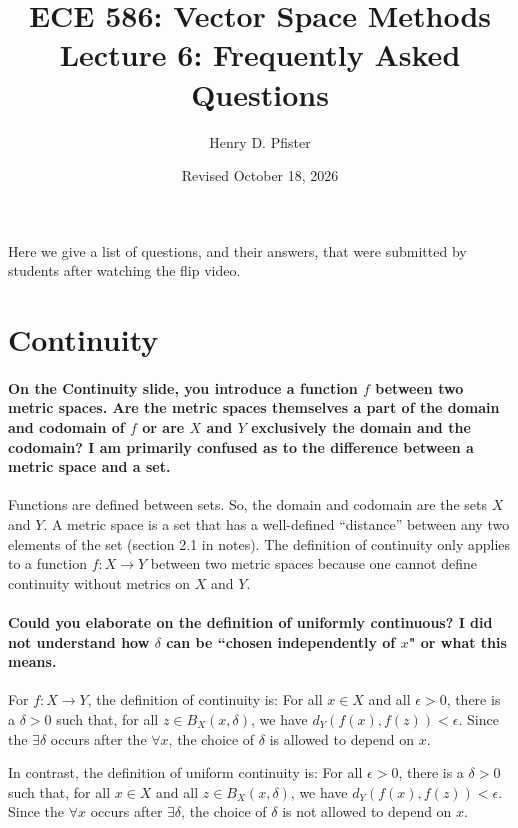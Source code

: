 \documentclass[10pt,english]{article}
\begin{document}
\title{ECE 586: Vector Space Methods \\ Lecture 6: Frequently Asked Questions}
\author{Henry D. Pfister \\ \univ}
\date{Revised October 18, 2026}

\maketitle

Here we give a list of questions, and their answers, that were submitted by students after watching the flip video.

\section{Continuity}

\paragraph{On the Continuity slide, you introduce a function $f$ between two metric spaces. Are the metric spaces themselves a part of the domain and codomain of $f$ or are $X$ and $Y$ exclusively the domain and the codomain? I am primarily confused as to the difference between a metric space and a set.}

Functions are defined between sets.
So, the domain and codomain are the sets $X$ and $Y$.
A metric space is a set that has a well-defined ``distance'' between any two elements of the set (section 2.1 in notes).
The definition of continuity only applies to a function $f\colon X \to Y$ between two metric spaces because one cannot define continuity without metrics on $X$ and $Y$.


\paragraph{Could you elaborate on the definition of uniformly continuous? I did not understand how $\delta$ can be ``chosen independently of $x$" or what this means.}

For $f:X \to Y$, the definition of continuity is: For all $x\in X$ and all $\epsilon > 0$, there is a $\delta >0$ such that, for all $z \in B_X (x,\delta)$, we have $d_Y (f(x),f(z)) < \epsilon$.
Since the $\exists\delta$ occurs after the $\forall x$, the choice of $\delta$ is allowed to depend on $x$.

In contrast, the definition of uniform continuity is: For all $\epsilon > 0$, there is a $\delta >0$ such that, for all $x\in X$ and all $z \in B_X (x,\delta)$, we have $d_Y (f(x),f(z)) < \epsilon$.
Since the $\forall x$ occurs after $\exists\delta$, the choice of $\delta$ is not allowed to depend on $x$.
\end{document}
